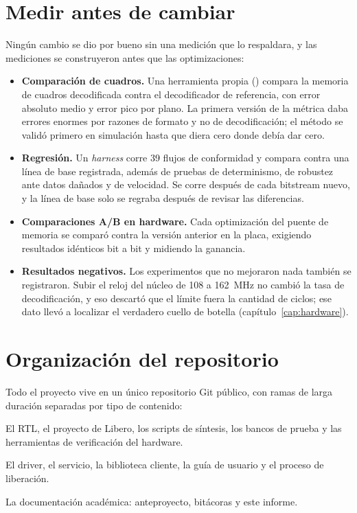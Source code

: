 \section{Medir antes de cambiar}
\label{sec:medir}

Ningún cambio se dio por bueno sin una medición que lo respaldara, y las
mediciones se construyeron antes que las optimizaciones:

\begin{itemize}
  \item \textbf{Comparación de cuadros.} Una herramienta propia
    () compara la memoria de cuadros decodificada contra el
    decodificador de referencia, con error absoluto medio y error pico por
    plano. La primera versión de la métrica daba errores enormes por razones
    de formato y no de decodificación; el método se validó primero en
    simulación hasta que diera cero donde debía dar cero.
  \item \textbf{Regresión.} Un \emph{harness} corre 39 flujos de
    conformidad y compara contra una línea de base registrada, además de
    pruebas de determinismo, de robustez ante datos dañados y de velocidad.
    Se corre después de cada bitstream nuevo, y la línea de base solo se
    regraba después de revisar las diferencias.
  \item \textbf{Comparaciones A/B en hardware.} Cada optimización del puente
    de memoria se comparó contra la versión anterior en la placa, exigiendo
    resultados idénticos bit a bit y midiendo la ganancia.
  \item \textbf{Resultados negativos.} Los experimentos que no mejoraron
    nada también se registraron. Subir el reloj del núcleo de 108 a
    162~MHz no cambió la tasa de decodificación, y eso
    descartó que el límite fuera la cantidad de ciclos; ese dato llevó a
    localizar el verdadero cuello de botella (capítulo~\ref{cap:hardware}).
\end{itemize}

\section{Organización del repositorio}
\label{sec:repositorio}

Todo el proyecto vive en un único repositorio Git público, con ramas de larga
duración separadas por tipo de contenido:

\begin{description}[style=nextline, leftmargin=1.5em]
  \item[\cmd{hardware\_development}] El RTL, el proyecto de Libero, los
    scripts de síntesis, los bancos de prueba y las herramientas de
    verificación del hardware.
  \item[\cmd{firmware\_development}] El driver, el servicio, la biblioteca
    cliente, la guía de usuario y el proceso de liberación.
  \item[\cmd{docs}] La documentación académica: anteproyecto, bitácoras y
    este informe.
\end{description}

